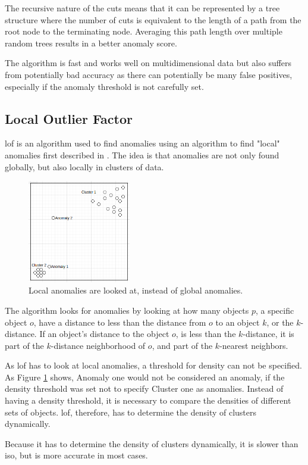 The recursive nature of the cuts means that it can be represented by a tree structure where the number of cuts is equivalent to the length of a path from the root node to the terminating node. Averaging this path length over multiple random trees results in a better anomaly score\cite{isolation_forest}.

The algorithm is fast and works well on multidimensional data but also suffers from potentially bad accuracy as there can potentially be many false positives, especially if the anomaly threshold is not carefully set.

\subsection{Local Outlier Factor}
\gls{lof} is an algorithm used to find anomalies using an algorithm to find "local" anomalies first described in \cite{lof}. The idea is that anomalies are not only found globally, but also locally in clusters of data.

\begin{figure}[htbp]
    \centering
    \includegraphics[width=0.4\textwidth]{Pictures/Sprint_4/lof.png}
    \caption{Local anomalies are looked at, instead of global anomalies.}
    \label{fig:lof}
\end{figure}

\noindent 
The algorithm looks for anomalies by looking at how many objects $p$, a specific object $o$, have a distance to less than the distance from $o$ to an object $k$, or the $k$-distance. If an object's distance to the object $o$, is less than the $k$-distance, it is part of the $k$-distance neighborhood of $o$, and part of the $k$-nearest neighbors.

As \gls{lof} has to look at local anomalies, a threshold for density can not be specified. As Figure \ref{fig:lof} shows, Anomaly one would not be considered an anomaly, if the density threshold was set not to specify Cluster one as anomalies. Instead of having a density threshold, it is necessary to compare the densities of different sets of objects. \gls{lof}, therefore, has to determine the density of clusters dynamically.

Because it has to determine the density of clusters dynamically, it is slower than \gls{iso}, but is more accurate in most cases.